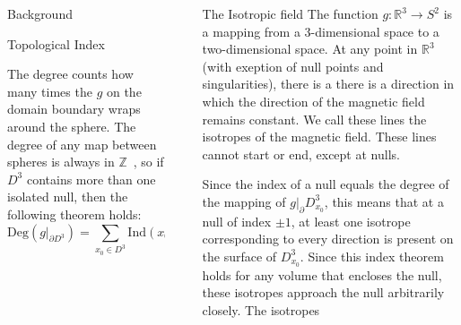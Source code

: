 \documentclass[final]{beamer}
\newlength{\sepwid}
\newlength{\onecolwid}
\begin{document}
\begin{frame}[t]
\begin{columns}[t]
\begin{column}{\onecolwid}
\begin{block}{\huge{Background}}
\begin{block}{Topological Index}
{\begin{minipage}{\textwidth}
\begin{equation}
    \end{equation}
    The degree counts how many times the $g$ on the domain boundary wraps around the sphere.
    The degree of any map between spheres is always in
    $\mathbb{Z}$~\cite{brouwer1911abbildung}, so 
    if $D^3$ contains more than one isolated null, then the following theorem holds:
    \begin{equation}\label{eq:indextheorem}
        \mathrm{Deg}(g|_{\partial D^3})= \sum_{x_0\in D^3} \mathrm{Ind}(x_0)
    \end{equation}
    \end{minipage}
    }
\end{block}
\end{block}


\end{column} %


\begin{column}{\sepwid}\end{column} %

\begin{column}{\onecolwid} %


%

\begin{block}{The Isotropic field}
    The function $g:\mathbb{R}^3\rightarrow S^2$ 
    is a mapping from a 3-dimensional space to a two-dimensional space.
    At any point in $\mathbb{R}^3$ (with exeption of null points and singularities), 
    there is a there is a direction in which the direction
    of the magnetic field remains constant. 
    We call these lines the isotropes of the magnetic field. 
    These lines cannot start or end, except at nulls. 

    Since the index of a null equals the degree of the mapping of $g|_\partial D^3_{x_0}$, 
    this means that at a null of index $\pm 1$, at least one isotrope corresponding to every
    direction is present on the surface of $D^3_{x_0}$. 
    Since this index theorem holds for any volume that encloses the null, these isotropes
    approach the null arbitrarily closely. 
    The isotropes  
    



\end{block}
\end{column}
\end{columns}
\end{frame}
\end{document}
